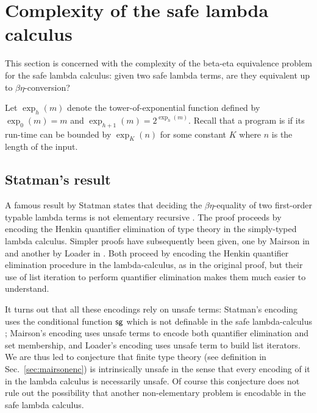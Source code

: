 \newcommand\bigo{\mathcal{O}} %
\newcommand\booltype{\mathsf{B}}
\newcommand\towerexp[2]{\exp_{#1}(#2)}

\section{Complexity of the safe lambda calculus}
This section is concerned with the complexity of the 
beta-eta equivalence problem for the safe lambda calculus:
given two safe lambda terms, are they equivalent up to $\beta\eta$-conversion?

 

Let $\towerexp{h}{m}$ denote the tower-of-exponential function
defined by $\towerexp{0}{m} = m$ and $\towerexp{h+1}{m} =
2^{\towerexp{h}{m}}$. Recall that a program is
 if its run-time can be bounded by
$\towerexp{K}{n}$ for some constant $K$ where $n$ is the length of
the input.

\subsection{Statman's result}

A famous result by Statman  states that deciding the
$\beta\eta$-equality of two first-order typable lambda terms is not
elementary recursive \cite{Statman:1979:TLE}. The proof proceeds by
encoding the Henkin quantifier elimination of type theory in the
simply-typed lambda calculus. Simpler proofs have subsequently been
given, one by Mairson in \cite{mairson1992spt} and another by Loader
in \cite{Loader1998}. Both proceed by encoding the Henkin quantifier
elimination procedure in the lambda-calculus, as in the original
proof, but their use of list iteration to perform quantifier
elimination makes them much easier to understand.

It turns out that all these encodings rely on unsafe terms:
Statman's encoding uses the conditional function $\sf sg$ which is
not definable in the safe lambda-calculus
\cite{blumong:safelambdacalculus}; Mairson's encoding uses unsafe
terms to encode both quantifier elimination and set membership, and
Loader's encoding uses unsafe term to build list iterators. We are
thus led to conjecture that finite type theory (see definition in
Sec.\ \ref{sec:mairsonenc}) is intrinsically unsafe in the sense
that every encoding of it in the lambda calculus is necessarily
unsafe. Of course this conjecture does not rule out the possibility
that another non-elementary problem is encodable in the safe lambda
calculus.

